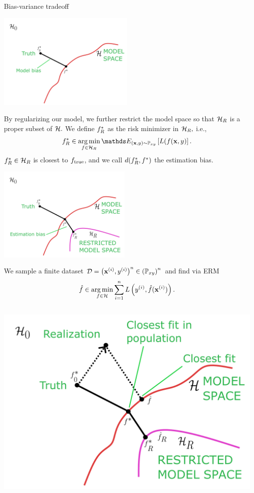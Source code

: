 \documentclass[11pt,compress,t,notes=noshow, xcolor=table]{beamer}
\begin{document}
\begin{vbframe}{Bias-variance tradeoff}
\begin{center}
\includegraphics[width=0.5\textwidth]{figure_man/bv_anim_6.pdf}
\end{center}
\framebreak 
By regularizing our model, we further restrict the model space so that $\mathcal{H}_R$ is a proper subset of $\mathcal{H}.$
We define $f^{\ast}_R$ as the risk minimizer in $\mathcal{H}_R,$ i.e.,
$$\fbayes_R \in \argmin_{f \in \Hspace_R} \E_{\xy \sim \Pxy}\left[L(f(\xv, y)\right].$$
$f^{\ast}_R \in \mathcal{H}_R$ is closest to $f_{\text{true}}$, and we call $d(f^{\ast}_R, f^{\ast})$ the estimation bias.
\begin{center}
\includegraphics[width=0.49\textwidth]{figure_man/bv_anim_5.pdf}
\end{center}
\framebreak

We sample a finite dataset $\mathcal{D} = \left(\mathbf{x}^{(i)}, y^{(i)}\right)^n \in \left(\mathbb{P}_{xy}\right)^n$ and find via ERM
$$\hat{f} \in \operatorname*{arg\,min}_{f\in\mathcal{H}} \sum\limits_{i=1}^n L\left(y^{(i)}, \hat{f} (\mathbf{x}^{(i)})\right).$$

\begin{columns}[onlytextwidth,T]

  \includegraphics[width=1.0\textwidth]{figure_man/bv_anim_4.pdf}


\end{columns}
\end{vbframe}
\end{document}

